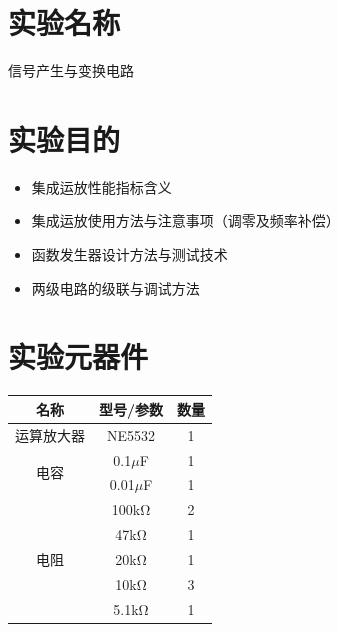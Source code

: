 \documentclass[a4paper,11pt,UTF8]{article}
\numberwithin{equation}{subsection}
\begin{document}
\tableofcontents\newpage
\section{实验名称}
信号产生与变换电路
\section{实验目的}
\begin{itemize}
	\item 集成运放性能指标含义
	\item 集成运放使用方法与注意事项（调零及频率补偿）
	\item 函数发生器设计方法与测试技术
	\item 两级电路的级联与调试方法	
\end{itemize}
\section{实验元器件}

\begin{table}[h]
	\centering
	\begin{tabular}{|c|c|c|}
		\hline
		名称 & 型号/参数 & 数量\\
		\hline
		运算放大器 & NE5532 & 1\\
		\hline
		\multirow{2}{*}{电容} & 0.1$\mu$F & 1 \\
		\cline{2-3}
		& 0.01$\mu$F & 1\\
		\hline
		\multirow{5}{*}{电阻} & 100kΩ & 2 \\
		\cline{2-3}
		& 47kΩ & 1\\
		\cline{2-3}
		& 20kΩ & 1\\
		\cline{2-3}
		& 10kΩ & 3\\
		\cline{2-3}
		& 5.1kΩ & 1\\
		\hline 		
	\end{tabular}
\end{table}
\end{document}
